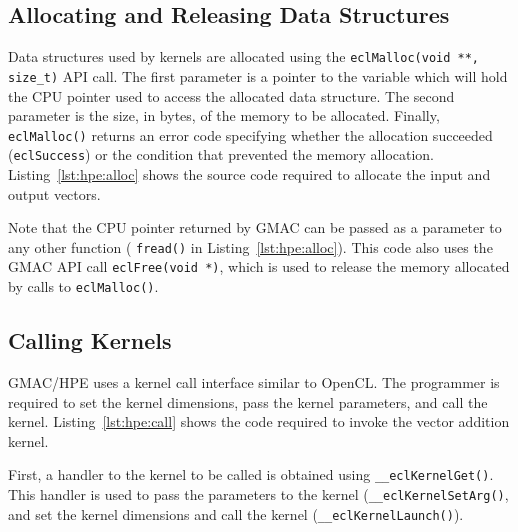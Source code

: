 

\subsection{Allocating and Releasing Data Structures}
Data structures used by kernels are allocated using the \texttt{eclMalloc(void **, size\_t)} API 
call. The first parameter is a pointer to the variable which will hold the CPU pointer used to 
access the allocated data structure. The second parameter is the size, in bytes, of the memory to be 
allocated. Finally, \texttt{eclMalloc()} returns an error code specifying whether the allocation 
succeeded (\texttt{eclSuccess}) or the condition that prevented the memory allocation.  
Listing~\ref{lst:hpe:alloc} shows the source code required to allocate the input and output vectors.  



Note that the CPU pointer returned by GMAC can be passed as a parameter to any other function (\eg 
\texttt{fread()} in Listing~\ref{lst:hpe:alloc}). This code also uses the GMAC API call 
\texttt{eclFree(void *)}, which is used to release the memory allocated by calls to 
\texttt{eclMalloc()}.

\subsection{Calling Kernels}
GMAC\slash HPE uses a kernel call interface similar to OpenCL\@. The programmer is required to set 
the kernel dimensions, pass the kernel parameters, and call the kernel. Listing~\ref{lst:hpe:call} 
shows the code required to invoke the vector addition kernel.



First, a handler to the kernel to be called is obtained using \texttt{\_\_eclKernelGet()}. This 
handler is used to pass the parameters to the kernel (\texttt{\_\_eclKernelSetArg()}, and set the 
kernel dimensions and call the kernel (\texttt{\_\_eclKernelLaunch()}).

